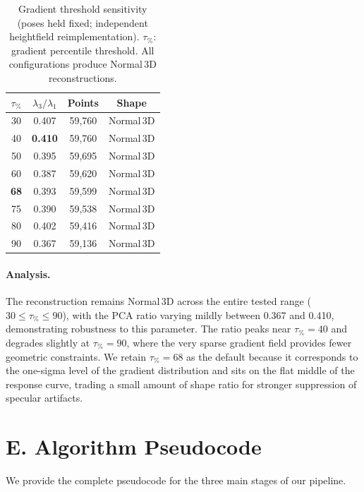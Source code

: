 \documentclass[review]{elsarticle}
\begin{document}
\begin{table}[h]
\centering
\caption{Gradient threshold sensitivity (poses held fixed; independent heightfield reimplementation). $\tau_{\%}$: gradient percentile threshold. All configurations produce Normal\,3D reconstructions.}
\label{tab:supp_threshold}
\setlength{\tabcolsep}{4pt}
\renewcommand{\arraystretch}{1.05}
\begin{tabular}{cccc}
\toprule
$\tau_{\%}$ & $\lambda_3/\lambda_1$ & Points & Shape \\
\midrule
30 & 0.407 & 59{,}760 & Normal\,3D \\
40 & \textbf{0.410} & 59{,}760 & Normal\,3D \\
50 & 0.395 & 59{,}695 & Normal\,3D \\
60 & 0.387 & 59{,}620 & Normal\,3D \\
\textbf{68} & 0.393 & 59{,}599 & Normal\,3D \\
75 & 0.390 & 59{,}538 & Normal\,3D \\
80 & 0.402 & 59{,}416 & Normal\,3D \\
90 & 0.367 & 59{,}136 & Normal\,3D \\
\bottomrule
\end{tabular}
\end{table}

\paragraph{Analysis.}
The reconstruction remains Normal\,3D across the entire tested range ($30 \leq \tau_{\%} \leq 90$), with the PCA ratio varying mildly between 0.367 and 0.410, demonstrating robustness to this parameter.
The ratio peaks near $\tau_{\%}=40$ and degrades slightly at $\tau_{\%}=90$, where the very sparse gradient field provides fewer geometric constraints.
We retain $\tau_{\%}=68$ as the default because it corresponds to the one-sigma level of the gradient distribution and sits on the flat middle of the response curve, trading a small amount of shape ratio for stronger suppression of specular artifacts.

\section*{E. Algorithm Pseudocode}

We provide the complete pseudocode for the three main stages of our pipeline.
\end{document}
